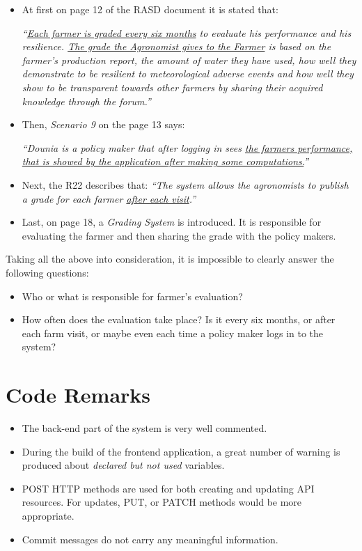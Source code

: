 \begin{itemize}
\item At first on page 12 of the RASD document it is stated that:

\textit{``\ul{Each farmer is graded every six months} to evaluate his performance and his resilience. \ul{The grade the Agronomist gives to the Farmer} is based on the farmer’s production report, the amount of water they have used, how well they demonstrate to be resilient to meteorological adverse events and how well they show to be transparent towards other farmers by sharing their acquired knowledge through the forum.''}

\item Then, \textit{Scenario 9} on the page 13 says:

\textit{``Dounia is a policy maker that after logging in sees \ul{the farmers performance, that is showed by the application after making some computations.}''}

\item Next, the R22 describes that: \textit{``The system allows the agronomists to publish a grade for each farmer \ul{after each visit}.''}

\item Last, on page 18, a \textit{Grading System} is introduced. It is responsible for evaluating the farmer and then sharing the grade with the policy makers.
\end{itemize}

Taking all the above into consideration, it is impossible to clearly answer the following questions:
\begin{itemize}
    \item Who or what is responsible for farmer's evaluation?
    \item How often does the evaluation take place? Is it every six months, or after each farm visit, or maybe even each time a policy maker logs in to the system?
\end{itemize}

\section{Code Remarks}

\begin{itemize}
    \item The back-end part of the system is very well commented.
    \item During the build of the frontend application, a great number of warning is produced about \textit{declared but not used} variables.
    \item POST HTTP methods are used for both creating and updating API resources. For updates, PUT, or PATCH methods would be more appropriate. 
    \item Commit messages do not carry any meaningful information.
\end{itemize}


